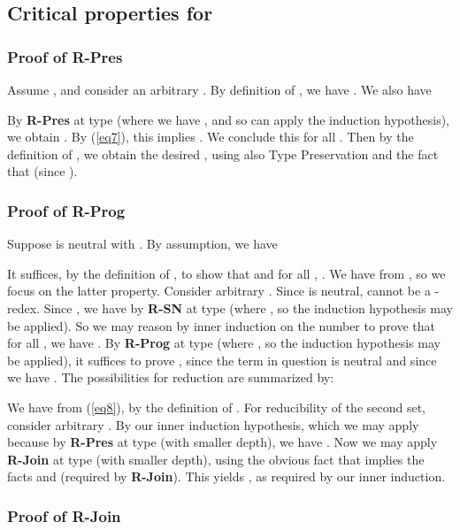 \documentclass[copyright]{eptcs}
\begin{document}
\subsection{Critical properties for }

\subsubsection{Proof of \textbf{R-Pres}}

Assume , and consider an
arbitrary .  By definition of
, we have .  We
also have


\noindent By \textbf{R-Pres} at type  (where we have
, and so can apply the induction
hypothesis), we obtain
.  By (\ref{eq7}),
this implies .  We
conclude this for all .  Then by the
definition of , we obtain the desired
, using also Type
Preservation and the fact that  (since ).

\subsubsection{Proof of \textbf{R-Prog}}

Suppose  is neutral with .  By
assumption, we have


\noindent It suffices, by the definition of , to show
that  and for all ,
. We have  from
, so we focus on the latter property.  Consider
arbitrary .  Since  is neutral,
 cannot be a -redex.  Since
, we have  by \textbf{R-SN} at
type  (where , so the induction
hypothesis may be applied).  So we may reason by inner induction on
the number  to prove that for all
, we have
.  By \textbf{R-Prog} at type
 (where , so the
induction hypothesis may be applied), it suffices to prove
, since the term in
question is neutral and since we have .  The possibilities for reduction are summarized
by:


\noindent We have  from
(\ref{eq8}), by the definition of .  For reducibility
of the second set, consider arbitrary .  By our inner
induction hypothesis, which we may apply because
 by \textbf{R-Pres} at type  (with
smaller depth), we have .  Now
we may apply \textbf{R-Join} at type  (with smaller depth),
using the obvious fact that  implies the facts  and  (required by
\textbf{R-Join}).  This yields
, as required by our inner
induction.

\subsubsection{Proof of \textbf{R-Join}}
\end{document}
